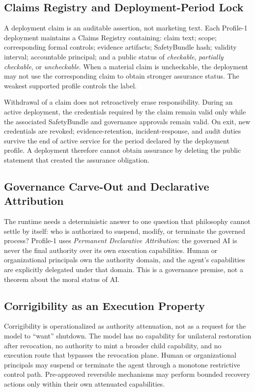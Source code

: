 \documentclass[11pt]{article}
\newcommand{\SafetyBundle}{\textsf{SafetyBundle}}
\begin{document}
\subsection{Claims Registry and Deployment-Period Lock}
A deployment claim is an auditable assertion, not marketing text. Each Profile-1 deployment maintains a Claims Registry containing: claim text; scope; corresponding formal controls; evidence artifacts; \SafetyBundle{} hash; validity interval; accountable principal; and a public status of \emph{checkable}, \emph{partially checkable}, or \emph{uncheckable}. When a material claim is uncheckable, the deployment may not use the corresponding claim to obtain stronger assurance status. The weakest supported profile controls the label.

Withdrawal of a claim does not retroactively erase responsibility. During an active deployment, the credentials required by the claim remain valid only while the associated \SafetyBundle{} and governance approvals remain valid. On exit, new credentials are revoked; evidence-retention, incident-response, and audit duties survive the end of active service for the period declared by the deployment profile. A deployment therefore cannot obtain assurance by deleting the public statement that created the assurance obligation.

\subsection{Governance Carve-Out and Declarative Attribution}
The runtime needs a deterministic answer to one question that philosophy cannot settle by itself: who is authorized to suspend, modify, or terminate the governed process? Profile-1 uses \emph{Permanent Declarative Attribution}: the governed AI is never the final authority over its own execution capabilities. Human or organizational principals own the authority domain, and the agent's capabilities are explicitly delegated under that domain. This is a governance premise, not a theorem about the moral status of AI.

\subsection{Corrigibility as an Execution Property}
Corrigibility is operationalized as authority attenuation, not as a request for the model to ``want'' shutdown. The model has no capability for unilateral restoration after revocation, no authority to mint a broader child capability, and no execution route that bypasses the revocation plane. Human or organizational principals may suspend or terminate the agent through a monotone restrictive control path. Pre-approved reversible mechanisms may perform bounded recovery actions only within their own attenuated capabilities.
\end{document}
